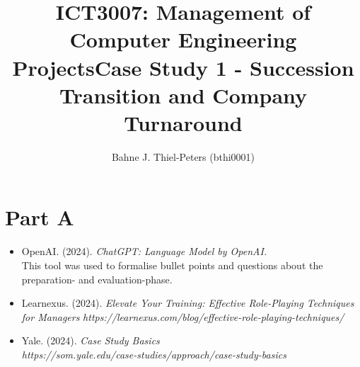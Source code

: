 \documentclass[a4paper,10pt]{article}
\title{ICT3007: Management of Computer Engineering Projects\newline \centering Case Study 1 - Succession Transition and Company Turnaround}
\author{
Bahne J. Thiel-Peters (bthi0001)
}
\begin{document}
\maketitle
\thispagestyle{empty}

\setcounter{page}{1}

\section{Part A}



\begin{itemize}
    \item OpenAI. (2024). \textit{ChatGPT: Language Model by OpenAI.} \\ 
    This tool was used to formalise bullet points and questions about the preparation- and evaluation-phase.
    \item Learnexus. (2024). \textit{Elevate Your Training: Effective Role-Playing Techniques for Managers} \textit{https://learnexus.com/blog/effective-role-playing-techniques/}
    \item Yale. (2024). \textit{Case Study Basics} \\ \textit{https://som.yale.edu/case-studies/approach/case-study-basics}
\end{itemize}
\end{document}
